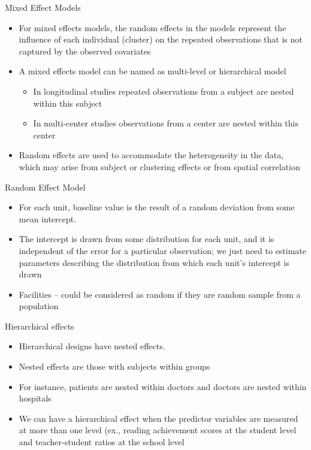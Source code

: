 \documentclass{beamer}
\begin{document}
\begin{frame}{Mixed Effect Models}
\begin{itemize}
\item For mixed effects models, the random effects in the models represent the influence of each individual (cluster) on the repeated observations that is not captured by the observed covariates
\vspace{0.5cm}
\item A mixed effects model can be named as multi-level or hierarchical model
\vspace*{2mm}
\begin{itemize}
\item In longitudinal studies repeated observations from a subject are nested within this subject
\vspace{0.5cm}
\item In multi-center studies observations from a center are nested within this center
\end{itemize}
\vspace{0.5cm}
\item Random effects are used to accommodate the heterogeneity in the data, which may arise from subject or clustering effects or from spatial correlation
\end{itemize}
\end{frame}

\begin{frame}{Random Effect Model}
\begin{itemize}
\item For each unit, baseline value is the result of a random deviation from some mean intercept.  
\item The intercept is drawn from some distribution for each unit, and it is independent of the error for a particular observation; we just need to estimate parameters describing the distribution from which each unit’s intercept is drawn
\item Facilities – could be considered as random if they are random sample from a population 
\end{itemize}
\end{frame}

\begin{frame}{Hierarchical effects}
\begin{itemize}
\item Hierarchical designs have nested effects.  
\item Nested effects are those with subjects within groups
\item For instance, patients  are nested within doctors and doctors  are nested within hospitals
\item We can have a hierarchical effect when the  predictor variables are measured at more than one level (ex., reading achievement scores at the student level and teacher-student ratios at the school level
\end{itemize}
\end{frame}
\end{document}
